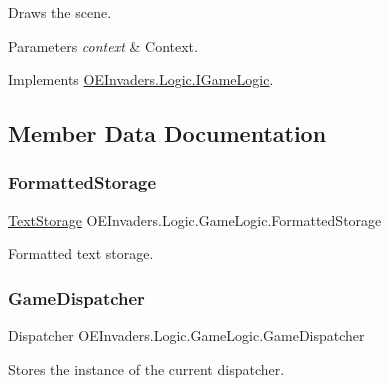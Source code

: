 Draws the scene. 


\begin{DoxyParams}{Parameters}
{\em context} & Context.\\
\hline
\end{DoxyParams}


Implements \mbox{\hyperlink{interface_o_e_invaders_1_1_logic_1_1_i_game_logic_a7afdd27b3cf620cd25c84e48a4d47ccd}{O\+E\+Invaders.\+Logic.\+I\+Game\+Logic}}.



\subsection{Member Data Documentation}
\mbox{\label{class_o_e_invaders_1_1_logic_1_1_game_logic_a649bf51cd8f5f517593fb0345281f7c9}} 
\subsubsection{\texorpdfstring{FormattedStorage}{FormattedStorage}}
{\footnotesize\ttfamily \mbox{\hyperlink{class_o_e_invaders_1_1_library_1_1_text_storage}{Text\+Storage}} O\+E\+Invaders.\+Logic.\+Game\+Logic.\+Formatted\+Storage\hspace{0.3cm}{\ttfamily [static]}}



Formatted text storage. 

\mbox{\label{class_o_e_invaders_1_1_logic_1_1_game_logic_a2601f892e14c04e58b31c62c6634c35e}} 
\subsubsection{\texorpdfstring{GameDispatcher}{GameDispatcher}}
{\footnotesize\ttfamily Dispatcher O\+E\+Invaders.\+Logic.\+Game\+Logic.\+Game\+Dispatcher\hspace{0.3cm}{\ttfamily [static]}}



Stores the instance of the current dispatcher. 

